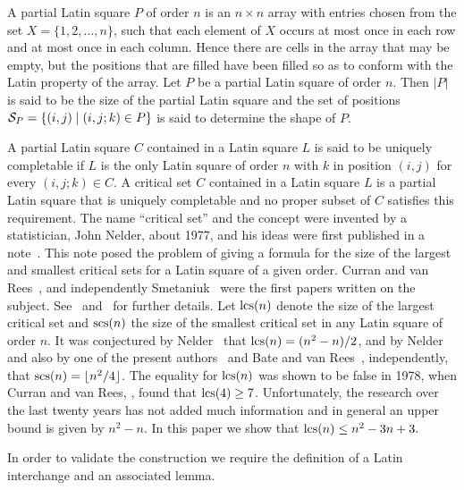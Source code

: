 \documentclass[12pt]{article}
\def\lcs#1{{\rm lcs}(#1)}
\def\scs#1{{\rm scs}(#1)}
\begin{document}
A {\sf partial Latin square} $P$ of order $n$ is an $n\times n$ array
with entries chosen
from the set $X = \{1,2, \ldots, n\}$, such that each element of $X$
occurs at most  once in each
row and at most once in each column.
Hence there are cells in the array that may be empty, but the positions that are
filled have been filled so as to conform with the Latin property of the array.
Let $P$ be a partial Latin square of
order $n$. Then $| P |$ is said to be the {\sf size} of the partial Latin
square and the set of positions ${\cal S}_P=\{(i,j) \mid
(i,j;k)\in P\}$
is said to determine the {\sf shape} of $P$.

A partial Latin square $C$ contained in a Latin square $L$
is said to be {\sf uniquely completable} if $L$ is the
only Latin square of order $n$ with $k$ in position $(i,j)$
for every $(i,j;k) \in C$.
A {\sf critical set} $C$ contained in a Latin square $L$
is a partial Latin square
that is uniquely completable
and no proper subset of $C$ satisfies
this requirement.
The name ``critical set'' and the concept were invented by a statistician,
John Nelder, about 1977, and his ideas were first published 
in a note~{\bf\cite{Nel1}}.  This note posed the problem of giving a formula for the
size of the largest and smallest critical sets for a Latin square of a
given order. Curran and van Rees~{\bf\cite{cv:cs}}, and independently
Smetaniuk~{\bf\cite{smetan}} were the first papers written on the
subject.
See~{\bf\cite{k2}} and~{\bf\cite{vanbate}} for further details.
Let $ \lcs{n}$ denote the size of the {\sf largest critical set}
and $\scs{n}$  the
size of the {\sf smallest critical set} in any Latin square of order $n$.
It was conjectured by Nelder~{\bf\cite{Nel2}}
  that  $ \lcs{n}  =(n^2-n)/2$,
 and by Nelder~{\bf\cite{Nel2}} and also by
 one of the present authors~{\bf\cite{kerman}} and
Bate and van Rees~{\bf\cite{vanbate}}, independently, that
 $\scs{n}  =\lfloor n^2/4 \rfloor$.
The equality for $\lcs{n}$ was shown to be false in 1978, when
Curran and van Rees, {\bf\cite{cv:cs}},
found that $\lcs{4} \geq 7$. Unfortunately, the research over the last
twenty years has not added much
information and in general an upper bound is given by
$n^2-n.$ In this paper we show that
$\lcs{n}  \le n^2-3n+3.$

 In order to validate the construction we require the definition of
 a Latin interchange and an associated  lemma.
\end{document}
